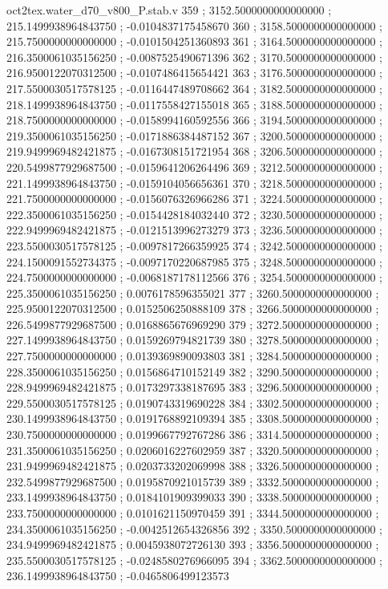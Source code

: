 \begin{filecontents}[overwrite]{oct2tex.water_d70_v800_P.stab.v}
359 ; 3152.5000000000000000 ; 215.1499938964843750 ; -0.0104837175458670
360 ; 3158.5000000000000000 ; 215.7500000000000000 ; -0.0101504251360893
361 ; 3164.5000000000000000 ; 216.3500061035156250 ; -0.0087525490671396
362 ; 3170.5000000000000000 ; 216.9500122070312500 ; -0.0107486415654421
363 ; 3176.5000000000000000 ; 217.5500030517578125 ; -0.0116447489708662
364 ; 3182.5000000000000000 ; 218.1499938964843750 ; -0.0117558427155018
365 ; 3188.5000000000000000 ; 218.7500000000000000 ; -0.0158994160592556
366 ; 3194.5000000000000000 ; 219.3500061035156250 ; -0.0171886384487152
367 ; 3200.5000000000000000 ; 219.9499969482421875 ; -0.0167308151721954
368 ; 3206.5000000000000000 ; 220.5499877929687500 ; -0.0159641206264496
369 ; 3212.5000000000000000 ; 221.1499938964843750 ; -0.0159104056656361
370 ; 3218.5000000000000000 ; 221.7500000000000000 ; -0.0156076326966286
371 ; 3224.5000000000000000 ; 222.3500061035156250 ; -0.0154428184032440
372 ; 3230.5000000000000000 ; 222.9499969482421875 ; -0.0121513996273279
373 ; 3236.5000000000000000 ; 223.5500030517578125 ; -0.0097817266359925
374 ; 3242.5000000000000000 ; 224.1500091552734375 ; -0.0097170220687985
375 ; 3248.5000000000000000 ; 224.7500000000000000 ; -0.0068187178112566
376 ; 3254.5000000000000000 ; 225.3500061035156250 ; 0.0076178596355021
377 ; 3260.5000000000000000 ; 225.9500122070312500 ; 0.0152506250888109
378 ; 3266.5000000000000000 ; 226.5499877929687500 ; 0.0168865676969290
379 ; 3272.5000000000000000 ; 227.1499938964843750 ; 0.0159269794821739
380 ; 3278.5000000000000000 ; 227.7500000000000000 ; 0.0139369890093803
381 ; 3284.5000000000000000 ; 228.3500061035156250 ; 0.0156864710152149
382 ; 3290.5000000000000000 ; 228.9499969482421875 ; 0.0173297338187695
383 ; 3296.5000000000000000 ; 229.5500030517578125 ; 0.0190743319690228
384 ; 3302.5000000000000000 ; 230.1499938964843750 ; 0.0191768892109394
385 ; 3308.5000000000000000 ; 230.7500000000000000 ; 0.0199667792767286
386 ; 3314.5000000000000000 ; 231.3500061035156250 ; 0.0206016227602959
387 ; 3320.5000000000000000 ; 231.9499969482421875 ; 0.0203733202069998
388 ; 3326.5000000000000000 ; 232.5499877929687500 ; 0.0195870921015739
389 ; 3332.5000000000000000 ; 233.1499938964843750 ; 0.0184101909399033
390 ; 3338.5000000000000000 ; 233.7500000000000000 ; 0.0101621150970459
391 ; 3344.5000000000000000 ; 234.3500061035156250 ; -0.0042512654326856
392 ; 3350.5000000000000000 ; 234.9499969482421875 ; 0.0045938072726130
393 ; 3356.5000000000000000 ; 235.5500030517578125 ; -0.0248580276966095
394 ; 3362.5000000000000000 ; 236.1499938964843750 ; -0.0465806499123573

\end{filecontents}
